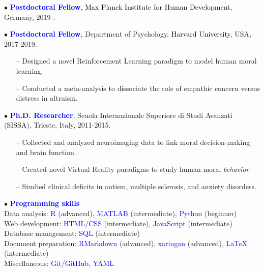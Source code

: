 \documentclass[10pt]{article}
\begin{document}
	\header


	$\bullet$ \textbf{\textcolor{blue}{Postdoctoral Fellow}}, \textcolor{black}{Max Planck Institute for Human Development}, Germany, 2019-.
	\miniskip
	
	$\bullet$ \textbf{\textcolor{blue}{Postdoctoral Fellow}}, Department of Psychology, \textcolor{black}{Harvard University}, USA, 2017-2019.
	\vspace*{-0.09in}
	
	\begin{itemize}
	\itemsep-0.1em 
	\item[--] Designed a novel Reinforcement Learning paradigm to model human moral learning.	
	\item[--] Conducted a meta-analysis to dissociate the role of empathic concern versus distress in altruism.
	\end{itemize}
	\miniskip
	\vspace*{-0.09in}

	$\bullet$ \textbf{\textcolor{blue}{Ph.D. Researcher}}, Scuola Internazionale Superiore di Studi Avanzati (\textcolor{black}{SISSA}), Trieste, Italy, 2011-2015.
	\vspace*{-0.09in}

	\begin{itemize}
	\itemsep-0.1em 
	\item[--] Collected	and analyzed neuroimaging data to link moral decision-making and brain function.
	\item[--] Created novel Virtual Reality paradigms to study human moral \textit{behavior}.
	\item[--] Studied clinical deficits in autism, multiple sclerosis, and anxiety disorders.
	\end{itemize}
    \vspace*{-0.09in}
    
	
	$\bullet$ \textcolor{blue}{\textbf{Programming skills}}\\
	\hspace*{0.1in} Data analysis: \textcolor{blue}{R} (advanced), \textcolor{blue}{MATLAB} (intermediate), \textcolor{blue}{Python} (beginner)\\
	\hspace*{0.1in} Web development: \textcolor{blue}{HTML/CSS} (intermediate), \textcolor{blue}{JavaScript} (intermediate)\\
	\hspace*{0.1in} Database management: \textcolor{blue}{SQL} (intermediate)\\
	\hspace*{0.1in}	Document preparation: \textcolor{blue}{RMarkdown} (advanced), \textcolor{blue}{xaringan} (advanced), \textcolor{blue}{\LaTeX{}} (intermediate)\\
	\hspace*{0.1in} Miscellaneous: \textcolor{blue}{Git/GitHub}, \textcolor{blue}{YAML} 
	\miniskip
	
\end{document}

